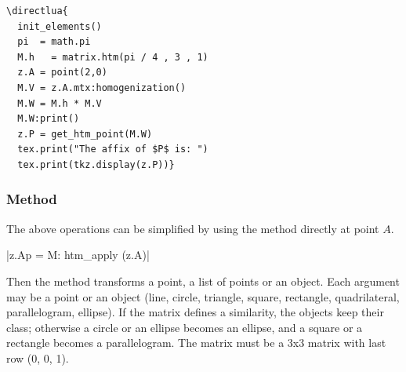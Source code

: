 \begin{minipage}{.5\textwidth}
\begin{verbatim}
\directlua{
  init_elements()
  pi  = math.pi
  M.h   = matrix.htm(pi / 4 , 3 , 1)
  z.A = point(2,0)
  M.V = z.A.mtx:homogenization()
  M.W = M.h * M.V
  M.W:print()
  z.P = get_htm_point(M.W)
  tex.print("The affix of $P$ is: ")
  tex.print(tkz.display(z.P))}
\end{verbatim}
\end{minipage}
\begin{minipage}{.5\textwidth}
\end{minipage}

\subsubsection{Method }
\label{ssub:method_code_htm__apply}
The above operations can be simplified by using the  method directly at point $A$.

\begin{mybox}
|z.Ap = M: htm_apply (z.A)|\\
\end{mybox}

Then the method  transforms a point, a list of points or an object.
Each argument may be a point or an object (line, circle, triangle, square, rectangle, quadrilateral, parallelogram, ellipse). If the matrix defines a similarity, the objects keep their class; otherwise a circle or an ellipse becomes an ellipse, and a square or a rectangle becomes a parallelogram. The matrix must be a 3x3 matrix with last row (0, 0, 1).


